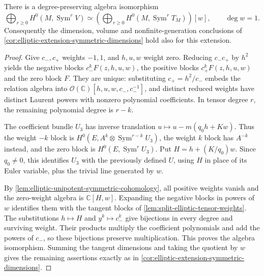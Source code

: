 \begin{proposition}\label{prop:elliptic-zero-ruling-section-ring}
There is a degree-preserving algebra isomorphism
\[
 \bigoplus_{r\geq0}H^0(M,\operatorname{Sym}^rV)
 \simeq
 \left(\bigoplus_{r\geq0}H^0(M,\operatorname{Sym}^rT_M)\right)[w],
 \qquad \deg w=1.
\]
Consequently the dimension, volume and nonfinite-generation conclusions of \cref{cor:elliptic-extension-symmetric-dimensions} hold also for this extension.
\end{proposition}
\begin{proof}
Give $c_-,c_+$ weights $-1,1$, and $h,u,w$ weight zero. Reducing $c_-c_+$ by $h^2$ yields the negative blocks $c_-^kF(z,h,u,w)$, the positive blocks $c_+^kF(z,h,u,w)$ and the zero block $F$. They are unique: substituting $c_+=h^2/c_-$ embeds the relation algebra into $\mathcal O(\mathbb C)[h,u,w,c_-,c_-^{-1}]$, and distinct reduced weights have distinct Laurent powers with nonzero polynomial coefficients. In tensor degree $r$, the remaining polynomial degree is $r-k$.

The coefficient bundle $U_3$ has inverse translation $u\mapsto u-m(q_0h+Kw)$. Thus the weight $-k$ block is $H^0(E,A^k\otimes\operatorname{Sym}^{r-k}U_3)$, the weight $k$ block has $A^{-k}$ instead, and the zero block is $H^0(E,\operatorname{Sym}^rU_3)$. Put $H=h+(K/q_0)w$. Since $q_0\ne0$, this identifies $U_3$ with the previously defined $U$, using $H$ in place of its Euler variable, plus the trivial line generated by $w$.

By \cref{lem:elliptic-unipotent-symmetric-cohomology}, all positive weights vanish and the zero-weight algebra is $\mathbb C[H,w]$. Expanding the negative blocks in powers of $w$ identifies them with the tangent blocks of \cref{lem:split-elliptic-tensor-weights}. The substitutions $h\mapsto H$ and $y^k\mapsto c_-^k$ give bijections in every degree and surviving weight. Their products multiply the coefficient polynomials and add the powers of $c_-$, so these bijections preserve multiplication. This proves the algebra isomorphism. Summing the tangent dimensions and taking the quotient by $w$ gives the remaining assertions exactly as in \cref{cor:elliptic-extension-symmetric-dimensions}.
\end{proof}

